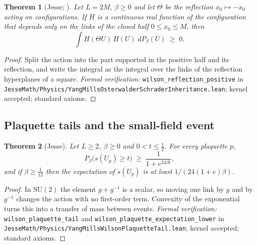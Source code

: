 \documentclass[11pt]{article}
\numberwithin{equation}{subsection}
\theoremstyle{plain}
\newtheorem{theorem}{Theorem}[subsection]
\theoremstyle{definition}
\newcommand{\SU}{\mathrm{SU}}
\begin{document}
\begin{theorem}[Jesse; \cite{OsterwalderSeiler}]\label{thm:rp}
Let $L=2M$, $\beta\ge 0$ and let $\Theta$ be the reflection $x_0\mapsto -x_0$ acting on
configurations. If $H$ is a continuous real function of the configuration that depends only on
the links of the closed half $0\le x_0\le M$, then
\begin{equation}\label{eq:rp}
\int H(\Theta U)\,H(U)\;dP_\beta(U)\;\ge\;0 .
\end{equation}
\end{theorem}
\begin{proof}
Split the action into the part supported in the positive half and its reflection, and write
the integral as the integral over the links of the reflection hyperplanes of a square.
\emph{Formal verification:} \texttt{wilson\_\allowbreak{}reflection\_\allowbreak{}positive} in
\texttt{Jesse\allowbreak{}Math/\allowbreak{}Physics/\allowbreak{}Yang\allowbreak{}Mills\allowbreak{}Osterwalder\allowbreak{}Schrader\allowbreak{}Inheritance.\allowbreak{}lean}; kernel accepted; standard
axioms.
\end{proof}

\subsection{Plaquette tails and the small-field event}

\begin{theorem}[Jesse]\label{thm:ptail}
Let $L\ge 2$, $\beta\ge 0$ and $0<t\le\frac12$. For every plaquette $p$,
\begin{equation}\label{eq:ptail}
P_\beta\bigl(s(U_p)\ge t\bigr)\;\ge\;\frac{1}{1+e^{24\beta t}} ,
\end{equation}
and if $\beta\ge\frac1{12}$ then the expectation of $s(U_p)$ is at least $1/(24(1+e)\beta)$.
\end{theorem}
\begin{proof}
In $\SU(2)$ the element $g+g^{-1}$ is a scalar, so moving one link by $g$ and by $g^{-1}$
changes the action with no first-order term. Convexity of the exponential turns this into a
transfer of mass between events. \emph{Formal verification:} \texttt{wilson\_\allowbreak{}plaquette\_\allowbreak{}tail} and
\texttt{wilson\_\allowbreak{}plaquette\_\allowbreak{}expectation\_\allowbreak{}lower} in
\texttt{Jesse\allowbreak{}Math/\allowbreak{}Physics/\allowbreak{}Yang\allowbreak{}Mills\allowbreak{}Wilson\allowbreak{}Plaquette\allowbreak{}Tail.\allowbreak{}lean}; kernel accepted; standard axioms.
\end{proof}
\end{document}
